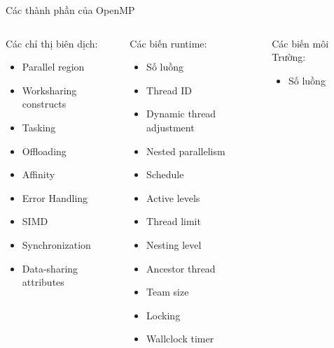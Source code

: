 \documentclass[10pt]{beamer}
\theoremstyle{remark}
\numberwithin{algocf}{section}
\numberwithin{equation}{section}
\numberwithin{dl}{section}
\numberwithin{figure}{section}
\begin{document}
\begin{frame}{Các thành phần của OpenMP}
    \begin{columns}[onlytextwidth]
        \begin{column}{0.3\textwidth}
            Các chỉ thị biên dịch:
            \begin{itemize}
                \item Parallel region	
                \item Worksharing constructs
                \item Tasking
                \item Offloading
                \item Affinity
                \item Error Handling
                \item SIMD
                \item Synchronization
                \item Data-sharing attributes
            \end{itemize}
        \end{column}
        \begin{column}{0.3\textwidth}
            Các biến runtime:
            \begin{itemize}
                \item Số luồng
                \item Thread ID 
                \item Dynamic thread adjustment
                \item Nested parallelism
                \item Schedule
                \item Active levels
                \item Thread limit
                \item Nesting level
                \item Ancestor thread
                \item Team size 
                \item Locking
                \item Wallclock timer
            \end{itemize}
        \end{column}
        \begin{column}{0.3\textwidth}
            Các biến môi Trường:
            \begin{itemize}
                \item Số luồng

\end{itemize}
\end{column}
\end{columns}
\end{frame}
\end{document}
